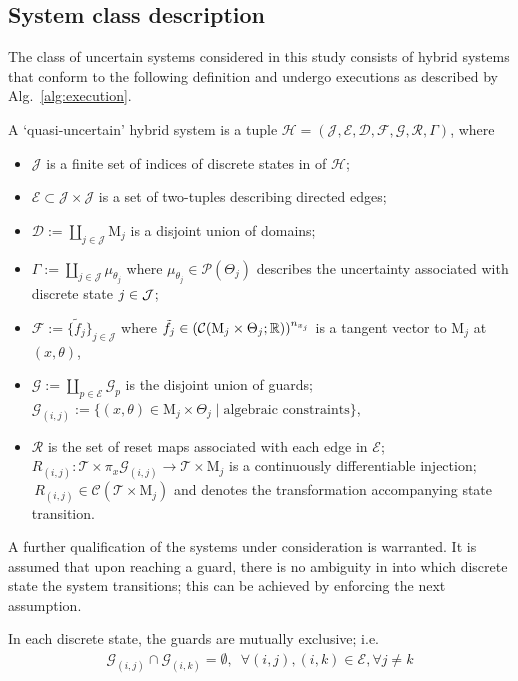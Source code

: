 \subsection{System class description}
  The class of uncertain systems considered in this study consists of hybrid systems that conform to the following definition and undergo executions as described by Alg.~\ref{alg:execution}.
\begin{defn}\label{def:system}
  A `quasi-uncertain' hybrid system is a tuple \mbox{$\mathcal H=(\mathcal J,\mathcal E,\mathcal D,\mathcal F,\mathcal G,\mathcal R,\Gamma)$}, where
  \begin{itemize}
    \item $\mathcal J$ is a finite set of indices of discrete states in of $\mathcal H$;
    \item $\mathcal E\subset \mathcal J\times \mathcal J$ is a set of two-tuples describing directed edges;
    \item $\mathcal D:=\coprod_{j\in\mathcal J} \mathrm{M}_j$ is a disjoint union of domains;
    \item $\Gamma:=\coprod_{j\in \mathcal J} \mu_{\theta_j}$ where $\mu_{\theta_j}\in \mathcal P(\Theta_j)$ describes the uncertainty associated with discrete state $j \in {\cal J}$;
    \item $\mathcal F:=\{\tilde f_j\}_{j\in \mathcal J}$ where \mbox{$\tilde f_j\in (\mathcal C(\mathrm{M}_j\times \Theta_j;\mathbb{R}))^{n_{x_j}}$} is a tangent vector to $\mathrm{M}_j$ at $(x,\theta)$,
    \item $\mathcal G:=\coprod_{p\in \mathcal E}\mathcal G_p$ is the disjoint union of guards; \mbox{$\mathcal G_{(i,j)}:=\{(x,\theta)\in \mathrm{M}_j\times \Theta_j\mid \text{algebraic constraints}\}$},
    \item $\mathcal R$ is the set of reset maps associated with each edge in $\mathcal E$; $R_{(i,j)}\colon \mathcal T\times \pi_{x}\mathcal G_{(i,j)}\rightarrow \mathcal T\times\mathrm{M}_j$ is a continuously differentiable injection; $\,R_{(i,j)}\in \mathcal C(\mathcal T\times \mathrm{M}_j)$ and denotes the transformation accompanying state transition.
  \end{itemize}
\end{defn}
A further qualification of the systems under consideration is warranted. It is assumed that upon reaching a guard, there is no ambiguity in into which discrete state the system transitions; this can be achieved by enforcing the next assumption.
\begin{assump}
    In each discrete state, the guards are mutually exclusive; i.e.
    \begin{align}
    \mathcal G_{(i,j)}\cap \mathcal G_{(i,k)}=\emptyset,\phantom{8}\forall (i,j),(i,k)\in \mathcal E, \forall j\ne k
    \end{align}
\end{assump}
